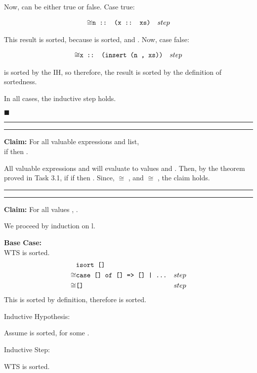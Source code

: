 \documentclass[11pt,letterpaper]{article}
\newcommand{\question}[2] {\vspace{.25in} \hrule\vspace{0.5em}
\noindent{\bf #1: #2} \vspace{0.5em}
\hrule \vspace{.10in}}
\begin{document}
Now,  can be either true or false. Case true:

\begin{align*}
\cong & \texttt{n :: (x :: xs)} && step \\
\end{align*}

This result is sorted, because  is sorted, and . Now, case false:

\begin{align*}
\cong & \texttt{x :: (insert (n , xs))} && step \\
\end{align*}

 is sorted by the IH, so therefore, the result is sorted by the definition of sortedness.

In all cases, the inductive step holds.

$\blacksquare$

\question{2}{Task 3.2}
{\bf Claim:} For all valuable expressions  and  list, \\
if  then .

All valuable expressions  and  will evaluate to values  and . Then, 
by the theorem proved in Task 3.1, if if  then .
Since,  $\cong$ , and  $\cong$ , the claim holds.

\question{3}{Task 3.3}
{\bf Claim:} For all values , .

We proceed by induction on l.

{\bf Base Case:}\\
WTS  is sorted.\\

\begin{align*}
      & \texttt{isort []} && \\
\cong & \texttt{case [] of [] => [] | ...} && step \\
\cong & \texttt{[]} && step \\
\end{align*}
This is sorted by definition, therefore  is sorted.

Inductive Hypothesis:

Assume  is sorted, for some .

Inductive Step:

WTS  is sorted.
\end{document}
